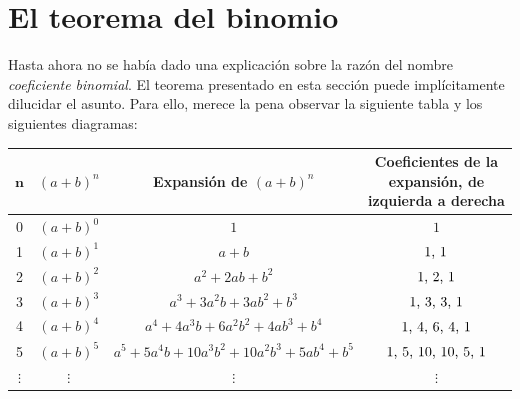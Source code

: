 \documentclass{article}
\theoremstyle{definition}
\begin{document}
\section{El teorema del binomio}
Hasta ahora no se había dado una explicación sobre la razón del nombre \textsl{coeficiente binomial}. El teorema presentado en esta sección puede implícitamente dilucidar el asunto. Para ello, merece la pena observar la siguiente tabla y los siguientes diagramas:
\begin{center}
\begin{tabular} 
{|c|c|c|c|} \hline
\rowcolor{verde}
$\mathbf{n}$ & $(a+b)^{n}$  & Expansión de $(a+b)^{n}$ & Coeficientes de la expansión, de izquierda a derecha\\
\hline \hline
\rowcolor{azul} 0 & $(a+b)^{0}$ & $1$ & $1$\\
\hline
\rowcolor{azul} 1 & $(a+b)^{1}$ & $a+b$ & $1 \textnormal{, }1$\\
\hline
\rowcolor{azul} 2 & $(a+b)^{2}$ & $a^2+2ab+b^2$ & $1 \textnormal{, }2 \textnormal{, 1}$\\
\hline
\rowcolor{azul} 3 & $(a+b)^{3}$ & $a^3+3a^{2}b+3ab^{2}+b^3$ & $1 \textnormal{, }3 \textnormal{, }3 \textnormal{, }1 $\\
\hline
\rowcolor{azul} 4 & $(a+b)^{4}$ & $a^4+4a^{3}b+6a^{2}b^{2}+4ab^3+b^{4}$ & $1 \textnormal{, }4 \textnormal{, }6 \textnormal{, }4 \textnormal{, }1 $\\
\hline
\rowcolor{azul} 5 & $(a+b)^{5}$ & $a^5+5a^{4}b+10a^{3}b^{2}+10a^{2}b^{3}+5ab^4+b^{5}$ & $1 \textnormal{, }5 \textnormal{, }10 \textnormal{, }10 \textnormal{, }5 \textnormal{, }1 $\\
\hline
\rowcolor{azul} $\vdots$ & $\vdots$ & $\vdots$ & $\vdots$\\
\hline
   
\end{tabular}
\end{center}
\end{document}

